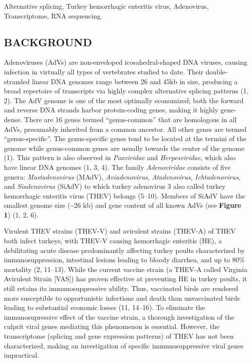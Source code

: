 \documentclass[
]{article}
\begin{document}
Alternative splicing, Turkey hemorrhagic enteritis virus, Adenovirus,
Transcriptome, RNA sequencing. \newpage

\subsection{BACKGROUND}\label{background}

Adenoviruses (AdVs) are non-enveloped icosahedral-shaped DNA viruses,
causing infection in virtually all types of vertebrates studied to date.
Their double-stranded linear DNA genomes range between 26 and 45kb in
size, producing a broad repertoire of transcripts via highly complex
alternative splicing patterns (1, 2). The AdV genome is one of the most
optimally economized; both the forward and reverse DNA strands harbor
protein-coding genes, making it highly gene-dense. There are 16 genes
termed ``genus-common'' that are homologous in all AdVs, presumably
inherited from a common ancestor. All other genes are termed
``genus-specific''. The genus-specific genes tend to be located at the
termini of the genome while genus-common genes are usually towards the
center of the genome (1). This pattern is also observed in
\emph{Poxviridae} and \emph{Herpesviridae}, which also have linear DNA
genomes (1, 3, 4). The family \emph{Adenoviridae} consists of five
genera: \emph{Mastadenovirus} (MAdV), \emph{Aviadenovirus},
\emph{Atadenovirus}, \emph{Ichtadenovirus}, and \emph{Siadenovirus}
(SiAdV) to which turkey adenovirus 3 also called turkey hemorrhagic
enteritis virus (THEV) belongs (5--10). Members of SiAdV have the
smallest genome size (\textasciitilde26 kb) and gene content of all
known AdVs (see \textbf{Figure 1}) (1, 2, 6).

Virulent THEV strains (THEV-V) and avirulent strains (THEV-A) of THEV
both infect turkeys, with THEV-V causing hemorrhagic enteritis (HE), a
debilitating acute disease predominantly affecting turkey poults
characterized by immunosuppression, intestinal lesions leading to bloody
diarrhea, and up to 80\% mortality (2, 11--13). While the current
vaccine strain (a THEV-A called Virginia Avirulent Strain {[}VAS{]}) has
proven effective at preventing HE in turkey poults, it still retains its
immunosuppressive ability. Thus, vaccinated birds are rendered more
susceptible to opportunistic infections and death than unvaccinated
birds leading to substantial economic losses (11, 14--16). To eliminate
the immunosupressive effect of the vaccine strain, a thorough
investigation of the culprit viral genes mediating this phenomenon is
essential. However, the transcriptome (splicing and gene expression
patterns) of THEV has not been characterized, making an investigation of
specific immunosuppressive viral genes impractical.
\end{document}
